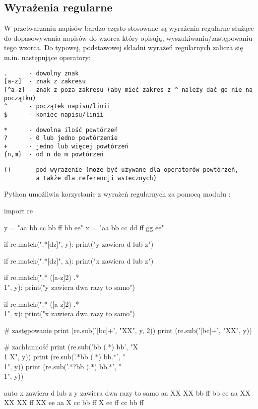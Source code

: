\documentclass{pdfBooklets}
\begin{document}
\subsection{Wyrażenia regularne {\Symbola 🤔}}

W przetwarzaniu napisów bardzo często stosowane są wyrażenia regularne służące do dopasowywania napisów do wzorca który opisują, wyszukiwaniu/zastępowaniu tego wzorca. Do typowej, podstawowej składni wyrażeń regularnych zalicza się m.in. następujące operatory:

\vspace{-6pt}\begin{Verbatim}
.      - dowolny znak
[a-z]  - znak z zakresu
[^a-z] - znak z poza zakresu (aby mieć zakres z ^ należy dać go nie na początku)
^      - początek napisu/linii
$      - koniec napisu/linii
\end{Verbatim}
\vspace{-8pt}\begin{Verbatim}
*      - dowolna ilość powtórzeń
?      - 0 lub jedno powtórzenie
+      - jedno lub więcej powtórzeń
{n,m}  - od n do m powtórzeń
\end{Verbatim}
\vspace{-8pt}\begin{Verbatim}
()     - pod-wyrażenie (może być używane dla operatorów powtórzeń,
         a także dla referencji wstecznych)
\end{Verbatim}

\pagebreak[2]\noindent
Python umożliwia korzystanie z wyrażeń regularnych za pomocą modułu :

\begin{CodeFrame}[python]{0.57\textwidth}
import re

y = "aa bb cc bb ff bb ee"
x = "aa bb cc dd ff gg ee"

if re.match(".*[dz]", y):
  print("y zawiera d lub z")

if re.match(".*[dz]", x):
  print("x zawiera d lub z")

if re.match(".* ([a-z]{2}) .* \\1", y):
  print("y zawiera dwa razy to samo")

if re.match(".* ([a-z]{2}) .* \\1", x):
  print("x zawiera dwa razy to samo")

# zastępowanie
print (re.sub('[bc]+', "XX", y, 2))
print (re.sub('[bc]+', "XX", y))

# zachłanność
print (re.sub('bb (.*) bb', "X \\1 X", y))
print (re.sub('.*bb (.*) bb.*', "\\1", y))
print (re.sub('.*?bb (.*) bb.*', "\\1", y))
\end{CodeFrame}
\begin{CodeFrame}{auto}
x zawiera d lub z
y zawiera dwa razy to samo
aa XX XX bb ff bb ee
aa XX XX XX ff XX ee
aa X cc bb ff X ee
ff
cc bb ff
\end{CodeFrame}
\end{document}
